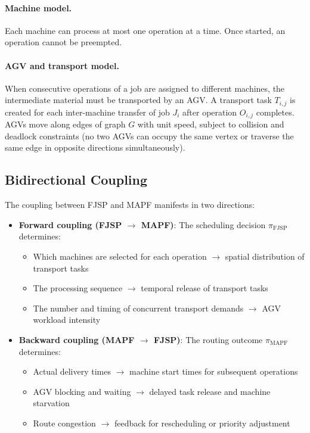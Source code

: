 \documentclass[11pt,a4paper]{article}
\begin{document}
\paragraph{Machine model.}
Each machine can process at most one operation at a time. Once started, an operation cannot be preempted.

\paragraph{AGV and transport model.}
When consecutive operations of a job are assigned to different machines, the intermediate material must be transported by an AGV. A transport task $T_{i,j}$ is created for each inter-machine transfer of job $J_i$ after operation $O_{i,j}$ completes. AGVs move along edges of graph $G$ with unit speed, subject to collision and deadlock constraints (no two AGVs can occupy the same vertex or traverse the same edge in opposite directions simultaneously).

\subsection{Bidirectional Coupling}

The coupling between FJSP and MAPF manifests in two directions:

\begin{itemize}[leftmargin=*]
    \item \textbf{Forward coupling (FJSP $\rightarrow$ MAPF)}: The scheduling decision $\pi_{\text{FJSP}}$ determines:
    \begin{itemize}
        \item Which machines are selected for each operation $\rightarrow$ spatial distribution of transport tasks
        \item The processing sequence $\rightarrow$ temporal release of transport tasks
        \item The number and timing of concurrent transport demands $\rightarrow$ AGV workload intensity
    \end{itemize}

    \item \textbf{Backward coupling (MAPF $\rightarrow$ FJSP)}: The routing outcome $\pi_{\text{MAPF}}$ determines:
    \begin{itemize}
        \item Actual delivery times $\rightarrow$ machine start times for subsequent operations
        \item AGV blocking and waiting $\rightarrow$ delayed task release and machine starvation
        \item Route congestion $\rightarrow$ feedback for rescheduling or priority adjustment
    \end{itemize}
\end{itemize}
\end{document}
